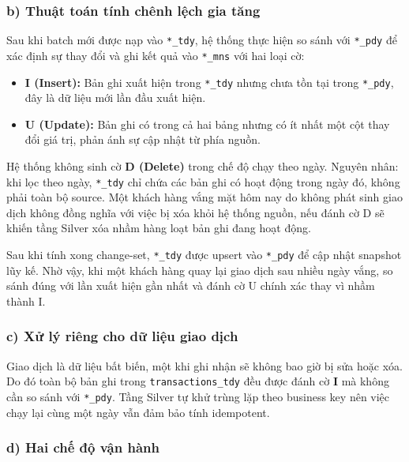 \subsubsection*{b) Thuật toán tính chênh lệch gia tăng}

Sau khi batch mới được nạp vào \texttt{*\_tdy}, hệ thống thực hiện so
sánh với \texttt{*\_pdy} để xác định sự thay đổi và ghi kết quả vào
\texttt{*\_mns} với hai loại cờ:

\begin{itemize}
    \item \textbf{I (Insert):} Bản ghi xuất hiện trong \texttt{*\_tdy}
          nhưng chưa tồn tại trong \texttt{*\_pdy}, đây là dữ liệu mới
          lần đầu xuất hiện.
    \item \textbf{U (Update):} Bản ghi có trong cả hai bảng nhưng có ít
          nhất một cột thay đổi giá trị, phản ánh sự cập nhật từ phía
          nguồn.
\end{itemize}

Hệ thống không sinh cờ \textbf{D (Delete)} trong chế độ chạy theo ngày.
Nguyên nhân: khi lọc theo ngày, \texttt{*\_tdy} chỉ chứa các bản ghi
có hoạt động trong ngày đó, không phải toàn bộ source. Một khách hàng
vắng mặt hôm nay do không phát sinh giao dịch không đồng nghĩa với việc
bị xóa khỏi hệ thống nguồn, nếu đánh cờ D sẽ khiến tầng Silver
xóa nhầm hàng loạt bản ghi đang hoạt động.

Sau khi tính xong change-set, \texttt{*\_tdy} được upsert vào
\texttt{*\_pdy} để cập nhật snapshot lũy kế. Nhờ vậy, khi một khách
hàng quay lại giao dịch sau nhiều ngày vắng, so sánh đúng với
lần xuất hiện gần nhất và đánh cờ U chính xác thay vì nhầm thành I.

\subsubsection*{c) Xử lý riêng cho dữ liệu giao dịch}

Giao dịch là dữ liệu bất biến, một khi ghi nhận sẽ không bao giờ bị
sửa hoặc xóa. Do đó toàn bộ bản ghi trong \texttt{transactions\_tdy}
đều được đánh cờ \textbf{I} mà không cần so sánh với \texttt{*\_pdy}.
Tầng Silver tự khử trùng lặp theo business key nên việc chạy lại cùng
một ngày vẫn đảm bảo tính idempotent.

\subsubsection*{d) Hai chế độ vận hành}


